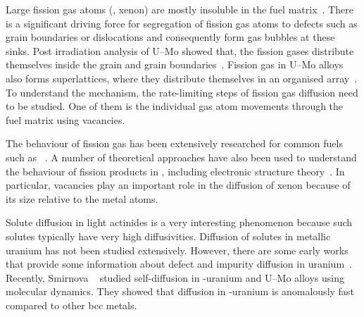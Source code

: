 Large fission gas atoms (\ie, xenon) are mostly insoluble in the fuel matrix~\cite{grimes1991stability,andersson2011u}. There is a significant driving force for segregation of fission gas atoms to defects such as grain boundaries or dislocations and consequently form gas bubbles at these sinks.  Post irradiation analysis of U--Mo showed that, the fission gases distribute themselves inside the grain and grain boundaries~\cite{miller2012advantages, miller2015transmission, gan2010transmission, gan2012tem}. Fission gas in U--Mo alloys also forms superlattices, where they distribute themselves in an organised array~\cite{gan2012tem,van2008transmission}. To understand the mechanism, the rate-limiting steps of fission gas diffusion need to be studied. One of them is the individual gas atom movements through the fuel matrix using vacancies.


The behaviour of fission gas
has been extensively researched for common fuels such as
~\cite{yun2008atomic,carter1972xenon,matzke1966diffusion,
    macewan1964xenon, une1987effects}.
A number of theoretical approaches have also been used to understand the
behaviour of fission products in , including electronic structure
theory~\cite{catlow1978fission,jackson1986calculation,grimes1989calculations,
    ball1990diffusion,grimes1991stability, petit1999location,
    crocombette2002ab, freyss2006ab, andersson2011u}.
In particular, vacancies play an important role in the diffusion of xenon
because of its size relative to the metal atoms.

Solute diffusion in light actinides is a very interesting phenomenon because
such solutes typically have very high diffusivities.
Diffusion of solutes in metallic uranium has not been studied extensively.
However, there are some early works that provide some information about defect
and impurity diffusion in uranium~\cite{adda1959etude,peterson1964diffusion,
    rothman1959self, rothman1961diffusion, adda1962etude, resnick1962self,
    rothman1961self, liu2012atomic}.
Recently, Smirnova \etal~\cite{smirnova2015atomistic} studied self-diffusion in
\textgamma-uranium and U--Mo alloys using molecular dynamics.
They showed that diffusion in \textgamma-uranium is anomalously fast compared
to other bcc metals.

